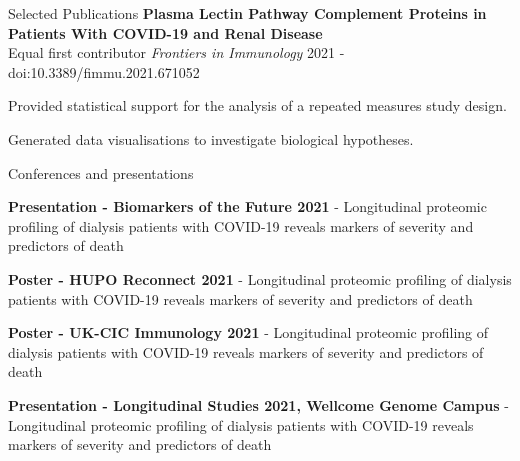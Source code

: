 \documentclass{resume}
\begin{document}
\begin{rSection}{Selected Publications}
\textbf{Plasma Lectin Pathway Complement Proteins in Patients With COVID-19 and Renal Disease} \\
Equal first contributor \hfill  \textit{Frontiers in Immunology} 2021 - doi:10.3389/fimmu.2021.671052

\vspace{2pt plus 1pt minus 1pt}
\item Provided statistical support for the analysis of a repeated measures study design.
\item Generated data visualisations to investigate biological hypotheses. \\

\end{rSection}

\begin{rSection}{Conferences and presentations}

\item \textbf{Presentation - Biomarkers of the Future 2021} - Longitudinal proteomic profiling of dialysis patients with COVID-19 reveals markers of severity and predictors of death
\vspace{2pt plus 1pt minus 1pt}

\item \textbf{Poster - HUPO Reconnect 2021} - Longitudinal proteomic profiling of dialysis patients with COVID-19 reveals markers of severity and predictors of death
\vspace{2pt plus 1pt minus 1pt}

\item \textbf{Poster - UK-CIC Immunology 2021} - Longitudinal proteomic profiling of dialysis patients with COVID-19 reveals markers of severity and predictors of death
\vspace{2pt plus 1pt minus 1pt}

\item \textbf{Presentation - Longitudinal Studies 2021, Wellcome Genome Campus} - Longitudinal proteomic profiling of dialysis patients with COVID-19 reveals markers of severity and predictors of death
\vspace{2pt plus 1pt minus 1pt}

\end{rSection}
\end{document}
